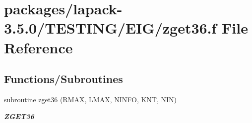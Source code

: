 \hypertarget{zget36_8f}{}\section{packages/lapack-\/3.5.0/\+T\+E\+S\+T\+I\+N\+G/\+E\+I\+G/zget36.f File Reference}
\label{zget36_8f}
\subsection*{Functions/\+Subroutines}
\begin{DoxyCompactItemize}
\item 
subroutine \hyperlink{group__complex16__eig_ga278000fdcd9e195f025572375e81eb60}{zget36} (R\+M\+A\+X, L\+M\+A\+X, N\+I\+N\+F\+O, K\+N\+T, N\+I\+N)
\begin{DoxyCompactList}\small\item\em {\bfseries Z\+G\+E\+T36} \end{DoxyCompactList}\end{DoxyCompactItemize}
